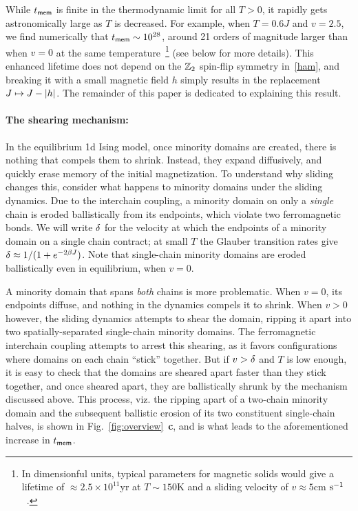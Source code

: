 \documentclass[prl,aps,twocolumn,groupedaddress,superscriptaddress,preprintnumbers,nobibnotes]{revtex4-2}
\newcommand{\tmem}{{t_{\sf mem}}}
\begin{document}
	While $\tmem$ is finite in the thermodynamic limit for all $T > 0$, it rapidly gets astronomically large as $T$ is decreased. For example, when $T = 0.6J$ and $v=2.5$, we find numerically that $\tmem \sim 10^{28}$, around 21 orders of magnitude larger than when $v=0$ at the same temperature~\footnote{In dimensionful units, typical parameters for magnetic solids would give a lifetime of $\approx 2.5\times 10^{11}$yr at $T \sim 150$K and a sliding velocity of $v \approx 5$cm ${\rm s}^{-1}$~\cite{angst2012strongly}.} (see below for more details). This enhanced lifetime does not depend on the $\mathbb{Z}_2$ spin-flip symmetry in~\eqref{ham}, and breaking it with a small magnetic field $h$ simply results in the replacement $J \mapsto J-|h|$.
	The remainder of this paper is dedicated to explaining this result. 
	
	
	
	
	
	
	\paragraph*{The shearing mechanism: } In the equilibrium 1d Ising model, once minority domains are created, there is nothing that compels them to shrink. Instead, they expand diffusively, and quickly erase memory of the initial magnetization. 
	To understand why sliding changes this, consider what happens to minority domains under the sliding dynamics. Due to the interchain coupling, a minority domain on only a {\it single} chain is eroded ballistically from its endpoints, which violate two ferromagnetic bonds. We will write $\delta$ for the velocity at which the endpoints of a minority domain on a single chain contract; at small $T$ the Glauber transition rates give $\delta \approx 1 / (1 + e^{-2 \beta J})$. Note that single-chain minority domains are eroded ballistically even in equilibrium, when $v=0$.
	
	A minority domain that spans {\it both} chains is more problematic. When $v=0$, its endpoints diffuse, and nothing in the dynamics compels it to shrink. When $v>0$ however, the sliding dynamics attempts to shear the domain, ripping it apart into two spatially-separated single-chain minority domains. The ferromagnetic interchain coupling attempts to arrest this shearing, as it favors configurations where domains on each chain ``stick'' together. But if $v >\delta$ and $T$ is low enough, it is easy to check that the domains are sheared apart faster than they stick together, and once sheared apart, they are ballistically shrunk by the mechanism discussed above. This process, viz. the ripping apart of a two-chain minority domain and the subsequent ballistic erosion of its two constituent single-chain halves, is shown in Fig.~\ref{fig:overview}~{\bf c}, and is what leads to the aforementioned increase in $\tmem$. 
	
\end{document}
